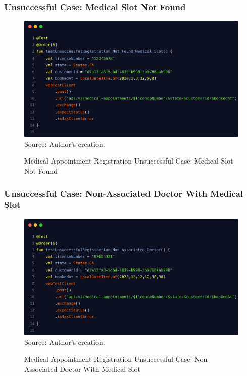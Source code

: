 \subsubsection{Unsuccessful Case: Medical Slot Not Found}

\begin{figure}[H]
	\centering
	\caption{Medical Appointment Registration Unsuccessful Case: Medical Slot Not Found}
	\includegraphics[width=1\linewidth]{figures/medical_appointment_registration_integration_test_unsuccessful_case_medical_slot_not_found.png}
	\label{fig:/medical_appointment_registration_integration_test_unsuccessful_case_medical_slot_not_found}
	\footnotesize Source: Author's creation.
\end{figure}

\subsubsection{Unsuccessful Case: Non-Associated Doctor With Medical Slot}

\begin{figure}[H]
	\centering
	\caption{Medical Appointment Registration Unsuccessful Case: Non-Associated Doctor With Medical Slot}
	\includegraphics[width=1\linewidth]{figures/medical_appointment_registration_integration_test_unsuccessful_case_nonassociated_doctor.png}
	\label{fig:medical_appointment_registration_integration_test_unsuccessful_case_nonassociated_doctor}
	\footnotesize Source: Author's creation.
\end{figure}

